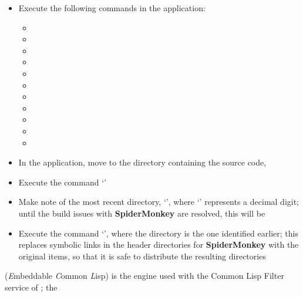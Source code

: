 \tertiaryEnd
{}
\begin{itemize}
\item Execute the following commands in the  application:
\begin{itemize}
\item {}
\item\exSp{}
\item\exSp{}
\item\exSp{}
\item\exSp{}
\item\exSp{}
\item\exSp{}
\item\exSp{}
\item\exSp{}
\item\exSp{}
\item\exSp{}
\end{itemize}
\item\exSp{}In the  application, move to the directory containing the
\mplusm{} source code, 
\item\exSp{}Execute the command `'
\item\exSp{}Make note of the most recent directory, `', where
`\asCode{\#}' represents a decimal digit;
until the build issues with \textbf{SpiderMonkey} are resolved, this will be 
\item\exSp{}Execute the command `', where the directory is the one identified
earlier;
this replaces symbolic links in the header directories for \textbf{SpiderMonkey} with the
original items, so that it is safe to distribute the resulting directories
\end{itemize}
\tertiaryEnd
\secondaryEnd
{}
\textbf{\ECL} (\textit{E}mbeddable \textit{C}ommon \textit{L}isp) is the
 engine used with the Common Lisp Filter service of \mplusm{}; the
